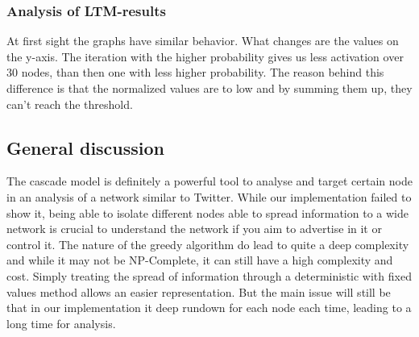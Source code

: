 \subsubsection{Analysis of LTM-results}
At first sight the graphs have similar behavior. What changes are the values on the y-axis. The iteration with the higher probability gives us less activation over 30 nodes, than then one with less higher probability. The reason behind this difference is that the normalized values are to low and by summing them up, they can't reach the threshold.\\

\subsection{General discussion}

The cascade model is definitely a powerful tool to analyse and target certain node in an analysis of a network similar to Twitter. While our implementation failed to show it, being able to isolate different nodes able to spread information to a wide network is crucial to understand the network if you aim to advertise in it or control it.
The nature of the greedy algorithm do lead to quite a deep complexity and while it may not be NP-Complete, it can still have a high complexity and cost.
Simply treating the spread of information through a deterministic with fixed values method allows an easier representation.
But the main issue will still be that in our implementation it deep rundown for each node each time, leading to a long time for analysis. 